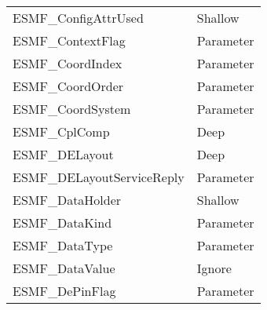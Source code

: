\begin{table}[t]
\begin{tabular}{ll}
ESMF\_ConfigAttrUsed        & Shallow\\
ESMF\_ContextFlag           & Parameter \\
ESMF\_CoordIndex            & Parameter \\
ESMF\_CoordOrder            & Parameter \\
ESMF\_CoordSystem           & Parameter \\
ESMF\_CplComp               & Deep \\
ESMF\_DELayout              & Deep \\
ESMF\_DELayoutServiceReply  & Parameter \\
ESMF\_DataHolder            & Shallow\\
ESMF\_DataKind              & Parameter \\
ESMF\_DataType              & Parameter \\
ESMF\_DataValue             & Ignore\\
ESMF\_DePinFlag             & Parameter \\

\end{tabular}
\end{table}



